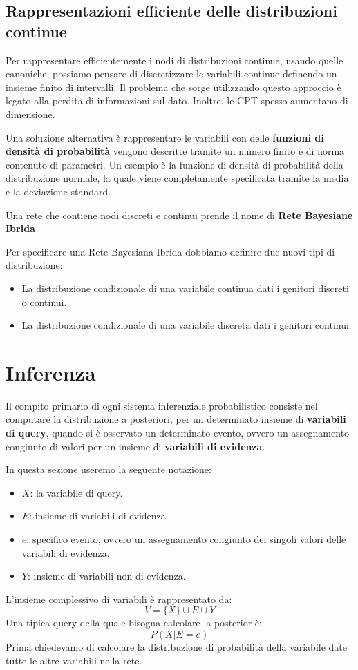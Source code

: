 \subsection{Rappresentazioni efficiente delle distribuzioni continue}
Per rappresentare efficientemente i nodi di distribuzioni continue, usando quelle
canoniche, possiamo pensare di discretizzare le variabili continue definendo un
insieme finito di intervalli. Il problema che sorge utilizzando questo approccio
è legato alla perdita di informazioni sul dato. Inoltre, le CPT spesso aumentano
di dimensione.

Una soluzione alternativa è rappresentare le variabili con delle \textbf{funzioni
    di densità di probabilità} vengono descritte tramite un numero finito e di
norma contenuto di parametri. Un esempio è la funzione di densità di probabilità
della distribuzione normale, la quale viene completamente specificata tramite
la media e la deviazione standard.
\begin{definizione}
    Una rete che contiene nodi discreti e continui prende il nome di \textbf{Rete
        Bayesiane Ibrida}
\end{definizione}
Per specificare una Rete Bayesiana Ibrida dobbiamo definire due nuovi tipi di
distribuzione:
\begin{itemize}
    \item La distribuzione condizionale di una variabile continua dati i genitori
          discreti o continui.
    \item La distribuzione condizionale di una variabile discreta dati i genitori
          continui.
\end{itemize}
\section{Inferenza}
Il compito primario di ogni sistema inferenziale probabilistico consiste nel
computare la distribuzione a posteriori, per un determinato insieme di \textbf{variabili
    di query}, quando si è osservato un determinato evento, ovvero un assegnamento
congiunto di valori per un insieme di \textbf{variabili di evidenza}.

In questa sezione useremo la seguente notazione:
\begin{itemize}
    \item $X$: la variabile di query.
    \item $E$: insieme di variabili di evidenza.
    \item $e$: specifico evento, ovvero un assegnamento congiunto dei singoli
          valori delle variabili di evidenza.
    \item $Y$: insieme di variabili non di evidenza.
\end{itemize}
L'insieme complessivo di variabili è rappresentato da:
\begin{equation*}
    V = \{X\} \cup E \cup Y
\end{equation*}
Una tipica query della quale bisogna calcolare la posterior è:
\begin{equation*}
    P(X|E=e)
\end{equation*}
Prima chiedevamo di calcolare la distribuzione di probabilità della variabile date
tutte le altre variabili nella rete.

